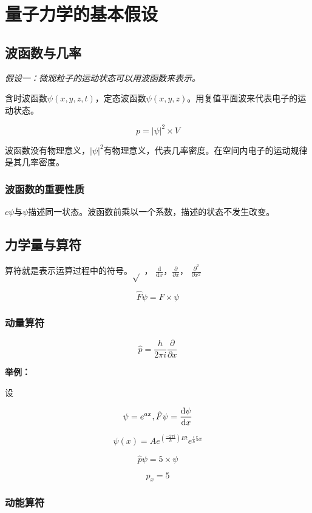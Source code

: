 \section{量子力学的基本假设}

\subsection{波函数与几率}

\textit{假设一：微观粒子的运动状态可以用波函数来表示。}

含时波函数$\psi(x, y, z, t)$，定态波函数$\psi(x, y, z)$。用复值平面波来代表电子的运动状态。

\[
    p = |\psi|^2 \times V   
\]

波函数没有物理意义，$|\psi|^2$有物理意义，代表几率密度。在空间内电子的运动规律是其几率密度。

\subsubsection{波函数的重要性质}

$c\psi$与$\psi$描述同一状态。波函数前乘以一个系数，描述的状态不发生改变。

\subsection{力学量与算符}

算符就是表示运算过程中的符号。$\sqrt{}$ ， $\frac{\mathrm{d}}{\mathrm{d}x}$，$\frac{\partial}{\partial x}$， $\frac{\partial^2}{\partial x^2}$

\[\hat{F}\psi = F \times \psi \]

\subsubsection{动量算符}

\[\hat{p} = \frac{h}{2 \pi i} \frac{\partial}{\partial x}\]

\textbf{举例：}

设

\[\psi = e^{ax}, \hat{F}\psi = \frac{\mathrm{d} \psi}{\mathrm{d} x} \]

\[
    \psi(x) = Ae^{\left(\frac{-2\pi i}{\hbar}\right)Et} e^{\frac{i}{\hbar}5x}
\]

\[
    \hat{p} \psi = 5 \times \psi   
\]

\[
    p_x = 5  
\]

\subsubsection{动能算符}

